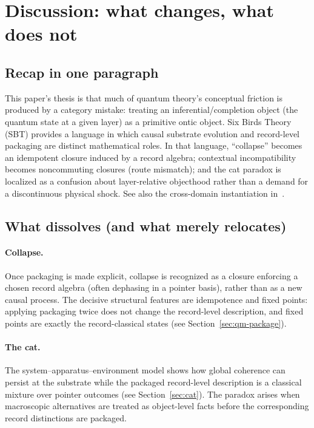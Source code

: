\section{Discussion: what changes, what does not}\label{sec:discussion}

\subsection{Recap in one paragraph}

This paper's thesis is that much of quantum theory's conceptual friction is produced by a category mistake: treating an inferential/completion object (the quantum state at a given layer) as a primitive ontic object.
Six Birds Theory (SBT) provides a language in which causal substrate evolution and record-level packaging are distinct mathematical roles.
In that language, ``collapse'' becomes an idempotent closure induced by a record algebra; contextual incompatibility becomes noncommuting closures (route mismatch); and the cat paradox is localized as a confusion about layer-relative objecthood rather than a demand for a discontinuous physical shock. See also the cross-domain instantiation in~\cite{Tsiokos2026Stone}.

\subsection{What dissolves (and what merely relocates)}

\paragraph{Collapse.}
Once packaging is made explicit, collapse is recognized as a closure enforcing a chosen record algebra (often dephasing in a pointer basis), rather than as a new causal process.
The decisive structural features are idempotence and fixed points: applying packaging twice does not change the record-level description, and fixed points are exactly the record-classical states (see Section~\ref{sec:qm-package}).

\paragraph{The cat.}
The system--apparatus--environment model shows how global coherence can persist at the substrate while the packaged record-level description is a classical mixture over pointer outcomes (see Section~\ref{sec:cat}).
The paradox arises when macroscopic alternatives are treated as object-level facts before the corresponding record distinctions are packaged.

